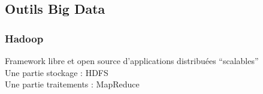 \subsection{Outils Big Data}

\begin{frame}
  \frametitle{Hadoop}
  Framework libre et open source d'applications distribuées ``scalables'' \\
  Une partie stockage : HDFS \\
  Une partie traitements : MapReduce
\end{frame}

